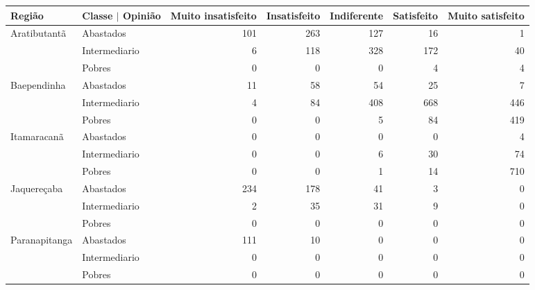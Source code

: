\begin{table}[h]
\scriptsize
\centering
\label{tabela:q16b}
\begin{tabular}{ll rrrrr}
  \toprule
 Região        & Classe $\vert$ Opinião & \multicolumn{1}{l}{ Muito insatisfeito} & \multicolumn{1}{l}{ Insatisfeito} & \multicolumn{1}{l}{ Indiferente} & \multicolumn{1}{l}{ Satisfeito} & \multicolumn{1}{l}{ Muito satisfeito} \\ 
   \midrule
Aratibutantã  & Abastados               &                101 &          263 &         127 &         16 &                1 \\ 
                & Intermediario           &                  6 &          118 &         328 &        172 &               40 \\ 
                & Pobres                  &                  0 &            0 &           0 &          4 &                4 \\ 
  Baependinha   & Abastados               &                 11 &           58 &          54 &         25 &                7 \\ 
                & Intermediario           &                  4 &           84 &         408 &        668 &              446 \\ 
                & Pobres                  &                  0 &            0 &           5 &         84 &              419 \\ 
  Itamaracanã   & Abastados               &                  0 &            0 &           0 &          0 &                4 \\ 
                & Intermediario           &                  0 &            0 &           6 &         30 &               74 \\ 
                & Pobres                  &                  0 &            0 &           1 &         14 &              710 \\ 
  Jaquereçaba   & Abastados               &                234 &          178 &          41 &          3 &                0 \\ 
                & Intermediario           &                  2 &           35 &          31 &          9 &                0 \\ 
                & Pobres                  &                  0 &            0 &           0 &          0 &                0 \\ 
  Paranapitanga & Abastados               &                111 &           10 &           0 &          0 &                0 \\ 
                & Intermediario           &                  0 &            0 &           0 &          0 &                0 \\ 
                & Pobres                  &                  0 &            0 &           0 &          0 &                0 \\ 
   \bottomrule
\end{tabular}
\end{table}

